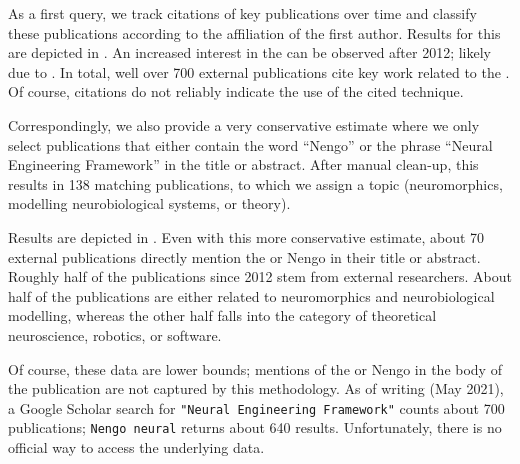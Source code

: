 As a first query, we track citations of key \NEF publications \citep[specifically][]{eliasmith2003neural,eliasmith2013how,bekolay2014nengo} over time and classify these publications according to the affiliation of the first author.
Results for this are depicted in .
An increased interest in the \NEF can be observed after 2012; likely due to \citet{eliasmith2012largescale}.
In total, well over 700 external publications cite key work related to the \NEF.
Of course, citations do not reliably indicate the use of the cited technique.%

Correspondingly, we also provide a very conservative estimate where we only select publications that either contain the word \enquote{Nengo} or the phrase \enquote{Neural Engineering Framework} in the title or abstract.
After manual clean-up, this results in 138 matching publications, to which we assign a topic (neuromorphics, modelling neurobiological systems, or theory).

Results are depicted in  .
Even with this more conservative estimate, about 70 external publications directly mention the \NEF or Nengo in their title or abstract. Roughly half of the publications since 2012 stem from external researchers.
About half of the publications are either related to neuromorphics and neurobiological modelling, whereas the other half falls into the category of theoretical neuroscience, robotics, or software.

Of course, these data are lower bounds; mentions of the \NEF or Nengo in the body of the publication are not captured by this methodology.
As of writing (May 2021), a Google Scholar search for \texttt{"Neural Engineering Framework"} counts about 700 publications; \texttt{Nengo neural} returns about 640 results.
Unfortunately, there is no official way to access the underlying data.%
